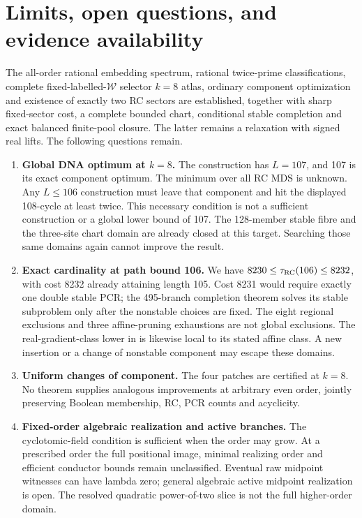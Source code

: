 \section{Limits, open questions, and evidence availability}
\label{sec:boundaries}
The all-order rational embedding spectrum, rational twice-prime
classifications, complete fixed-labelled-$\mathcal W$ selector $k=8$ atlas, ordinary
component optimization and existence of exactly two RC sectors
are established, together with sharp fixed-sector cost, a complete
bounded chart, conditional stable completion and exact balanced finite-pool
closure. The latter remains a relaxation with signed real lifts. The following
questions remain.

\begin{enumerate}
\item \textbf{Global DNA optimum at $k=8$.}
The construction has $L=107$, and 107 is its exact component
optimum. The minimum over all RC MDS is unknown.
Any $L\le106$ construction must leave that component and hit the
displayed 108-cycle at least twice. This necessary condition
is not a sufficient construction or a global lower bound of 107.
The 128-member stable fibre and the three-site chart domain are
already closed at this target. Searching those same domains again
cannot improve the result.

\item \textbf{Exact cardinality at path bound 106.}
We have $8230\le\tau_{\operatorname{RC}}(106)\le8232$, with cost 8232 already
attaining length 105. Cost 8231 would require exactly one double
stable PCR; the 495-branch completion theorem solves its stable
subproblem only after the nonstable choices are fixed. The eight
regional exclusions and three affine-pruning exhaustions are not
global exclusions. The real-gradient-class lower in
 is likewise local to its stated affine class.
A new insertion or a change of nonstable component may escape these domains.

\item \textbf{Uniform changes of component.}
The four patches are certified at $k=8$. No theorem supplies
analogous improvements at arbitrary even order, jointly
preserving Boolean membership, RC, PCR counts and acyclicity.

\item \textbf{Fixed-order algebraic realization and active branches.}
The cyclotomic-field condition is sufficient when the order
may grow. At a prescribed order the full positional image,
minimal realizing order and efficient conductor bounds remain
unclassified. Eventual raw midpoint witnesses can have lambda
zero; general algebraic active midpoint realization is open.
The resolved quadratic power-of-two slice is not the full
higher-order domain.


\end{enumerate}
